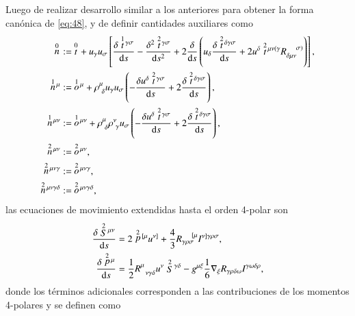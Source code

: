 Luego de realizar desarrollo similar a los anteriores para obtener la forma canónica de \eqref{eq:48}, y de definir cantidades auxiliares como
\begin{align}
\des{0}{n} &:= \ \des{0}{t} + u_{\gamma} u_{\sigma} \left[ \cd{\des{1}{t}^{\gamma \sigma}} - \frac{\delta^2 \des{2}{t}^{\gamma \sigma}}{\mathrm{d}s^2} +2 \cd{} \left( u_{\delta} \cd{\des{2}{t}^{\delta \gamma \sigma}} + 2 u^{\delta} \des{2}{t}^{\mu \nu (\gamma} R_{\delta \mu \nu}^{\ \ \ \ \sigma)} \right) \right],\\
\des{1}{n}^{\mu} &:= \ \des{1}{o}^{\mu} + \rho^{\mu}_{\ \delta} u_{\gamma} u_{\sigma} \left( -\cd{u^{\delta} \des{2}{t}^{\gamma \sigma}} + 2\cd{\des{2}{t}^{\delta \gamma \sigma}} \right),\\
\des{1}{n}^{\mu \nu} &:= \ \des{1}{o}^{\mu \nu} + \rho^{\mu}_{\ \delta} \rho^{\nu}_{\ \gamma} u_{\sigma} \left( -\cd{u^{\delta} \des{2}{t}^{\gamma \sigma}} + 2\cd{\des{2}{t}^{\delta \gamma \sigma}} \right),\\
\des{2}{n}^{\mu \nu} &:= \ \des{2}{o}^{\mu \nu},\\
\des{2}{n}^{\mu \nu \gamma} &:= \ \des{2}{o}^{\mu \nu \gamma},\\
\des{2}{n}^{\mu \nu \gamma \delta} &:= \ \des{2}{o}^{\mu \nu \gamma \delta},
\end{align}
las ecuaciones de movimiento extendidas hasta el orden 4-polar son \cite{Steinhoff-Puetzfeld}
\begin{align}
\label{eq:espin-4polo}
\frac{\delta \stackrel{2}{S}{\!}^{\mu \nu}}{\mathrm{d}s} &= 2\stackrel{2}{p}{\!}^{[\mu} u^{\nu]} + \frac{4}{3} R_{\gamma \rho \sigma}^{\ \ \ \ [\mu} I^{\nu] \gamma \rho \sigma},\\
\label{eq:49}
\frac{\delta \stackrel{2}{p}{\!}^{\mu}}{\mathrm{d}s} &= \frac{1}{2} R^{\mu}_{\ \ \nu \gamma \delta} u^{\nu} \stackrel{2}{S}{\!}^{\gamma \delta} - g^{\mu \xi} \frac{1}{6} \nabla_{\xi} R_{\gamma \rho \delta \omega} I^{\gamma \omega \delta \rho},
\end{align}
donde los términos adicionales corresponden a las contribuciones de los momentos 4-polares y se definen como
